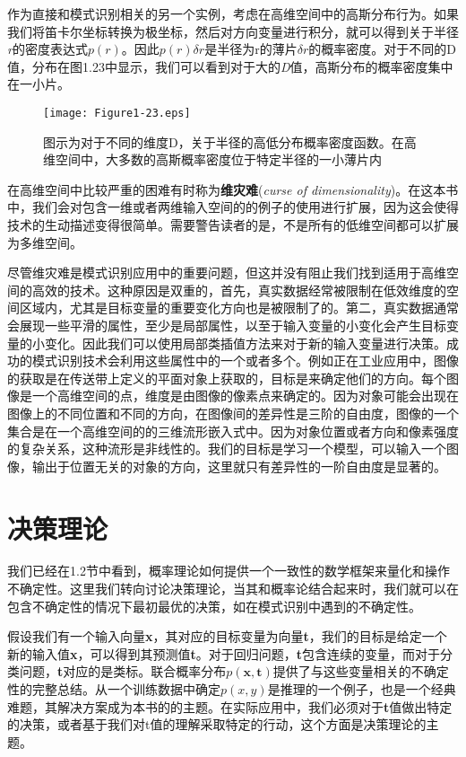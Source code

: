 	作为直接和模式识别相关的另一个实例，考虑在高维空间中的高斯分布行为。如果我们将笛卡尔坐标转换为极坐标，然后对方向变量进行积分，就可以得到关于半径\textit{r}的密度表达式$p(r)$。因此$p(r)\delta r$是半径为r的薄片$\delta r$的概率密度。对于不同的D值，分布在图1.23中显示，我们可以看到对于大的\textit{D}值，高斯分布的概率密度集中在一小片。
	
	\begin{figure}[t]
		\parbox{.4\textwidth}{\caption{ 图示为对于不同的维度D，关于半径的高低分布概率密度函数。在高维空间中，大多数的高斯概率密度位于特定半径的一小薄片内 }}
		\parbox{.5\textwidth}{\texttt{[image: Figure1-23.eps]}}
	\end{figure}
	
	在高维空间中比较严重的困难有时称为\textbf{维灾难}(\textit{curse of dimensionality})。在这本书中，我们会对包含一维或者两维输入空间的的例子的使用进行扩展，因为这会使得技术的生动描述变得很简单。需要警告读者的是，不是所有的低维空间都可以扩展为多维空间。
	
	尽管维灾难是模式识别应用中的重要问题，但这并没有阻止我们找到适用于高维空间的高效的技术。这种原因是双重的，首先，真实数据经常被限制在低效维度的空间区域内，尤其是目标变量的重要变化方向也是被限制了的。第二，真实数据通常会展现一些平滑的属性，至少是局部属性，以至于输入变量的小变化会产生目标变量的小变化。因此我们可以使用局部类插值方法来对于新的输入变量进行决策。成功的模式识别技术会利用这些属性中的一个或者多个。例如正在工业应用中，图像的获取是在传送带上定义的平面对象上获取的，目标是来确定他们的方向。每个图像是一个高维空间的点，维度是由图像的像素点来确定的。因为对象可能会出现在图像上的不同位置和不同的方向，在图像间的差异性是三阶的自由度，图像的一个集合是在一个高维空间的的三维流形嵌入式中。因为对象位置或者方向和像素强度的复杂关系，这种流形是非线性的。我们的目标是学习一个模型，可以输入一个图像，输出于位置无关的对象的方向，这里就只有差异性的一阶自由度是显著的。
	
\section{决策理论}
	我们已经在1.2节中看到，概率理论如何提供一个一致性的数学框架来量化和操作不确定性。这里我们转向讨论决策理论，当其和概率论结合起来时，我们就可以在包含不确定性的情况下最初最优的决策，如在模式识别中遇到的不确定性。
	
	假设我们有一个输入向量\textbf{x}，其对应的目标变量为向量\textbf{t}，我们的目标是给定一个新的输入值\textbf{x}，可以得到其预测值\textbf{t}。对于回归问题，\textbf{t}包含连续的变量，而对于分类问题，\textbf{t}对应的是类标。联合概率分布$p(\textbf{x}, \textbf{t})$提供了与这些变量相关的不确定性的完整总结。从一个训练数据中确定$p(x, y)$是推理的一个例子，也是一个经典难题，其解决方案成为本书的的主题。在实际应用中，我们必须对于\textbf{t}值做出特定的决策，或者基于我们对t值的理解采取特定的行动，这个方面是决策理论的主题。
	

